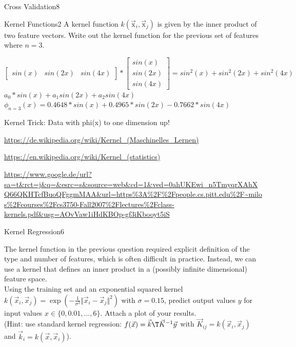 \begin{questions}
\begin{question}{Cross Validation}{8}
\begin{answer}
	\end{answer}
	\end{question}
	
	
	
	
	
	\begin{question}{Kernel Functions}{2}
		A kernel function $k(\vec{\mbox{x}}_{i},\vec{\mbox{x}}_{j})$ is given by the inner product of two feature vectors. Write out the kernel function for the previous set of features where $n=3$.
		
	\begin{answer}
		$\begin{bmatrix}
		sin(x)&sin(2x)&sin(4x)
		\end{bmatrix}*
		\begin{bmatrix}
			sin(x)\\sin(2x)\\sin(4x)
		\end{bmatrix}=sin^2(x)+sin^2(2x)+sin^2(4x)$ \\
			$a_0*sin(x)+a_1 sin(2x)+a_2 sin(4x)$\\
	$\phi_{n=3}(x)=0.4648* sin(x)+0.4965* sin(2x)-0.7662* sin(4x)$
		
		Kernel Trick: Data with phi(x) to one dimension up! 
		
	\hyperlink{https://de.wikipedia.org/wiki/Kernel\_(Maschinelles\_Lernen)}{https://de.wikipedia.org/wiki/Kernel\_(Maschinelles\_Lernen)}
	
	\hyperlink{https://en.wikipedia.org/wiki/Kernel\_(statistics)}{		https://en.wikipedia.org/wiki/Kernel\_(statistics)}
	
	\url{https://www.google.de/url?sa=t&rct=j&q=&esrc=s&source=web&cd=1&ved=0ahUKEwi_n5TmyqrXAhXQ66QKHTcfBuoQFggmMAA&url=https\%3A\%2F\%2Fpeople.cs.pitt.edu\%2F~milos\%2Fcourses\%2Fcs3750-Fall2007\%2Flectures\%2Fclass-kernels.pdf&usg=AOvVaw1iHdKBOp-gf3iKbooyt5iS}

	\end{answer}
	\end{question}
	
	
	
	\begin{question}{Kernel Regression}{6}
		
		The kernel function in the previous question required explicit definition of the type and number of features, which is often difficult in practice. Instead, we can use a kernel that defines an inner product in a (possibly infinite dimensional) feature space. \\
		Using the training set and an exponential squared kernel 		$k( \vec{x}_{i} , \vec{x}_{j} )= \exp ( -\frac{1}{\sigma^{2}} \Vert \vec{x}_{i}-\vec{x}_{j}\Vert ^{2} )$ with $\sigma=0.15$, predict output values $y$ for input values $x\in\{0,0.01,\ldots,6\}$. Attach a plot of your results.
		\\
		(Hint: use standard kernel regression: $f(\mbox{\ensuremath{\vec{x}}})=\vec{k}\T\vec{K}^{-1}\vec{y}$ with $\vec{K}_{ij}=k(\vec{x}_{i},\vec{x}_{j})$ and $\vec{k}_{i}=k(\vec{x},\vec{x}_{i})$).
		

\end{question}
\end{questions}
